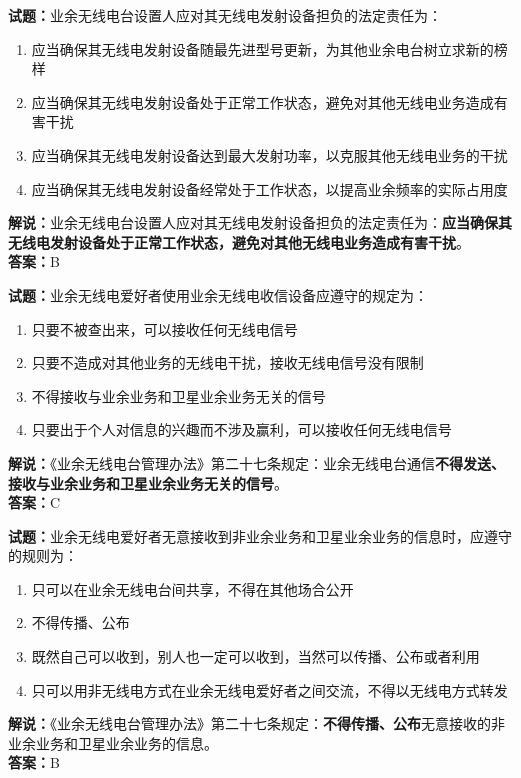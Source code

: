 \documentclass{ctexbook}
\begin{document}
\bigskip


\noindent\textbf{试题：}业余无线电台设置人应对其无线电发射设备担负的法定责任为：
\begin{enumerate}[leftmargin=3em]
\item 应当确保其无线电发射设备随最先进型号更新，为其他业余电台树立求新的榜样
\item 应当确保其无线电发射设备处于正常工作状态，避免对其他无线电业务造成有害干扰
\item 应当确保其无线电发射设备达到最大发射功率，以克服其他无线电业务的干扰
\item 应当确保其无线电发射设备经常处于工作状态，以提高业余频率的实际占用度
\end{enumerate}
\noindent\textbf{解说：}业余无线电台设置人应对其无线电发射设备担负的法定责任为：\textbf{应当确保其无线电发射设备处于正常工作状态，避免对其他无线电业务造成有害干扰}。\\\noindent\textbf{答案：}B


\bigskip


\noindent\textbf{试题：}业余无线电爱好者使用业余无线电收信设备应遵守的规定为：
\begin{enumerate}[leftmargin=3em]
\item 只要不被查出来，可以接收任何无线电信号
\item 只要不造成对其他业务的无线电干扰，接收无线电信号没有限制
\item 不得接收与业余业务和卫星业余业务无关的信号
\item 只要出于个人对信息的兴趣而不涉及赢利，可以接收任何无线电信号
\end{enumerate}
\noindent\textbf{解说：}《业余无线电台管理办法》第二十七条规定：业余无线电台通信\textbf{不得发送、接收与业余业务和卫星业余业务无关的信号}。\\\noindent\textbf{答案：}C



\bigskip


\noindent\textbf{试题：}业余无线电爱好者无意接收到非业余业务和卫星业余业务的信息时，应遵守的规则为：
\begin{enumerate}[leftmargin=3em]
\item 只可以在业余无线电台间共享，不得在其他场合公开
\item 不得传播、公布
\item 既然自己可以收到，别人也一定可以收到，当然可以传播、公布或者利用
\item 只可以用非无线电方式在业余无线电爱好者之间交流，不得以无线电方式转发
\end{enumerate}
\noindent\textbf{解说：}《业余无线电台管理办法》第二十七条规定：\textbf{不得传播、公布}无意接收的非业余业务和卫星业余业务的信息。\\\noindent\textbf{答案：}B
\end{document}

